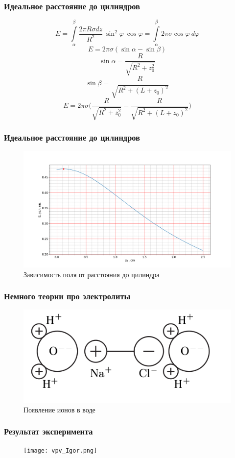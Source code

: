\documentclass{beamer} %
\begin{document}
\begin{frame}[c]
	\frametitle{Идеальное расстояние до цилиндров}
	\centering

\centering
$$E = \int\limits_\alpha^\beta{\frac{2 \pi R \sigma dz}{R^2} \ \sin^2 \varphi \ \cos \varphi} = \int\limits_\alpha^\beta{2 \pi \sigma \cos \varphi \ d\varphi}$$
$$E = 2 \pi \sigma (\sin \alpha - \sin \beta)$$
$$\sin \alpha = \frac{R}{\sqrt{R^2+z_0^2}}$$
$$\sin \beta = \frac{R}{\sqrt{R^2+(L+z_0)^2}}$$
$$E = 2 \pi \sigma \bigg( \frac{R}{\sqrt{R^2+z_0^2}} - \frac{R}{\sqrt{R^2+(L+z_0)^2}} \bigg)$$

\end{frame}
\begin{frame}[c]
	\frametitle{Идеальное расстояние до цилиндров}
	\centering
\begin{figure}[h]

\centering

\includegraphics[width=0.8\linewidth]{vpv_E.png}

\caption{Зависимость поля от расстояния до цилиндра}
\label{fig:mpr}

\end{figure}
\end{frame}

\begin{frame}[c]
	\frametitle{Немного теории про электролиты}
	\centering
\begin{figure}[h]

\centering

\includegraphics[width=0.6\linewidth]{vpv_ions.png}

\caption{Появление ионов в воде}
\label{fig:mpr}

\end{figure}
\end{frame}

\begin{frame}[c]
	\frametitle{Результат эксперимента}
	\centering
\begin{figure}[h]

\centering

\texttt{[image: vpv\_Igor.png]}

\label{fig:mpr}

\end{figure}
\end{frame}
\end{document}
